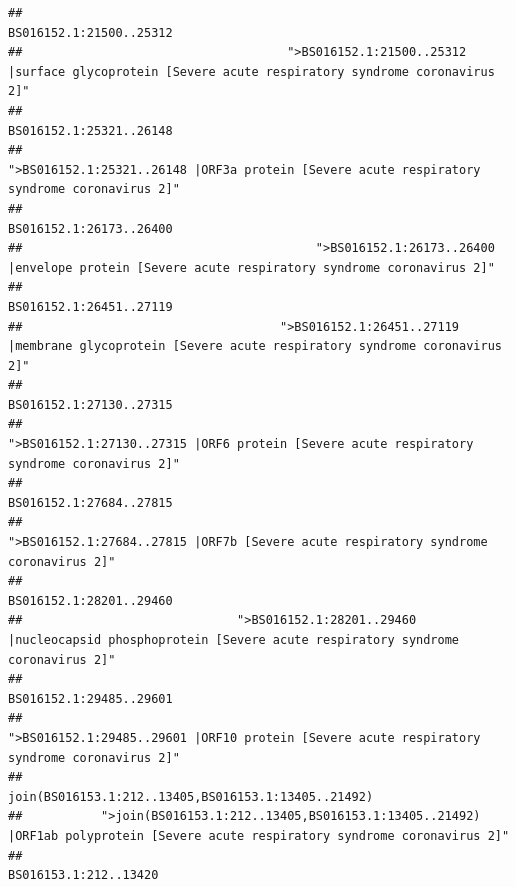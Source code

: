 \documentclass[
]{article}
\begin{document}
\begin{verbatim}
##                                                                                                                BS016152.1:21500..25312 
##                                     ">BS016152.1:21500..25312 |surface glycoprotein [Severe acute respiratory syndrome coronavirus 2]" 
##                                                                                                                BS016152.1:25321..26148 
##                                            ">BS016152.1:25321..26148 |ORF3a protein [Severe acute respiratory syndrome coronavirus 2]" 
##                                                                                                                BS016152.1:26173..26400 
##                                         ">BS016152.1:26173..26400 |envelope protein [Severe acute respiratory syndrome coronavirus 2]" 
##                                                                                                                BS016152.1:26451..27119 
##                                    ">BS016152.1:26451..27119 |membrane glycoprotein [Severe acute respiratory syndrome coronavirus 2]" 
##                                                                                                                BS016152.1:27130..27315 
##                                             ">BS016152.1:27130..27315 |ORF6 protein [Severe acute respiratory syndrome coronavirus 2]" 
##                                                                                                                BS016152.1:27684..27815 
##                                                    ">BS016152.1:27684..27815 |ORF7b [Severe acute respiratory syndrome coronavirus 2]" 
##                                                                                                                BS016152.1:28201..29460 
##                              ">BS016152.1:28201..29460 |nucleocapsid phosphoprotein [Severe acute respiratory syndrome coronavirus 2]" 
##                                                                                                                BS016152.1:29485..29601 
##                                            ">BS016152.1:29485..29601 |ORF10 protein [Severe acute respiratory syndrome coronavirus 2]" 
##                                                                                    join(BS016153.1:212..13405,BS016153.1:13405..21492) 
##           ">join(BS016153.1:212..13405,BS016153.1:13405..21492) |ORF1ab polyprotein [Severe acute respiratory syndrome coronavirus 2]" 
##                                                                                                                  BS016153.1:212..13420 

\end{verbatim}
\end{document}
